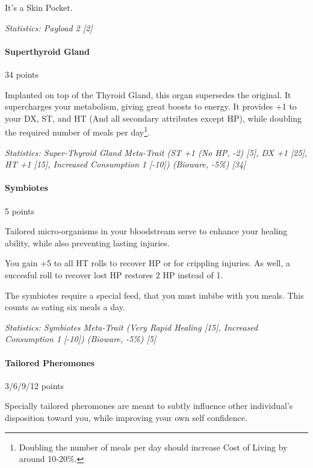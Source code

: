 \begin{multicols*}{3}
	It's a Skin Pocket. 
	
	\textit{\textcolor{OliveGreen}{Statistics: Payload 2 [2]}}
	
	\paragraph{Superthyroid Gland}
	\begin{flushright}
		34 points
	\end{flushright}
	
	Implanted on top of the Thyroid Gland, this organ supersedes the original. It supercharges your metabolism, giving great boosts to energy. It provides +1 to your DX, ST, and HT (And all secondary attributes except HP), while doubling the required number of meals per day\footnote{Doubling the number of meals per day should increase Cost of Living by around 10-20\%.}.
	
	\textit{\textcolor{OliveGreen}{Statistics: Super-Thyroid Gland Meta-Trait (ST +1 (No HP, -2) [5], DX +1 [25], HT +1 [15], Increased Consumption 1 [-10]) (Bioware, -5\%) [34]}}
	
	\paragraph{Symbiotes}
	\begin{flushright}
		5 points
	\end{flushright}
	
	Tailored micro-organisms in your bloodstream serve to enhance your healing ability, while also preventing lasting injuries.
	
	You gain +5 to all HT rolls to recover HP or for crippling injuries. As well, a succesful roll to recover lost HP restores 2 HP instead of 1.
	
	The symbiotes require a special feed, that you must imbibe with you meals. This counts as eating six meals a day.
	
	\textit{\textcolor{OliveGreen}{Statistics: Symbiotes Meta-Trait (Very Rapid Healing [15], Increased Consumption 1 [-10]) (Bioware, -5\%) [5]}}
	
	\paragraph{Tailored Pheromones}
	\begin{flushright}
		3/6/9/12 points
	\end{flushright}
	
	Specially tailored pheromones are meant to subtly influence other individual's disposition toward you, while improving your own self confidence. 
	

\end{multicols*}
